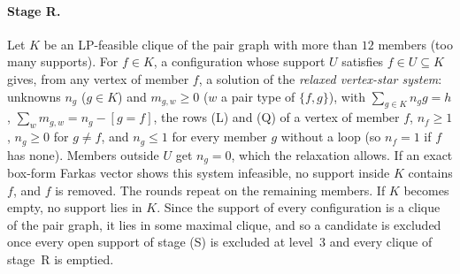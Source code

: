 \documentclass[11pt]{article}
\theoremstyle{definition}
\begin{document}
\paragraph{Stage R.} Let $K$ be an LP-feasible clique of the pair graph with more than $12$ members
(too many supports). For $f\in K$, a configuration whose support $U$ satisfies $f\in U\subseteq K$
gives, from any vertex of member $f$, a solution of the \emph{relaxed vertex-star system}: unknowns
$n_g$ ($g\in K$) and $m_{g,w}\ge0$ ($w$ a pair type of $\{f,g\}$), with $\sum_{g\in K}n_gg=h$,
$\sum_wm_{g,w}=n_g-[g=f]$, the rows (L) and (Q) of a vertex of member $f$, $n_f\ge1$, $n_g\ge0$ for
$g\ne f$, and $n_g\le1$ for every member $g$ without a loop (so $n_f=1$ if $f$ has none). Members
outside $U$ get $n_g=0$, which the relaxation allows. If an exact box-form Farkas vector shows this system infeasible, no support
inside $K$ contains $f$, and $f$ is removed. The rounds repeat on the remaining members. If $K$
becomes empty, no support lies in $K$. Since the support of every configuration is a clique of the
pair graph, it lies in some maximal clique, and so a candidate is excluded once every open support
of stage (S) is excluded at level~3 and every clique of stage~R is emptied.
\end{document}
